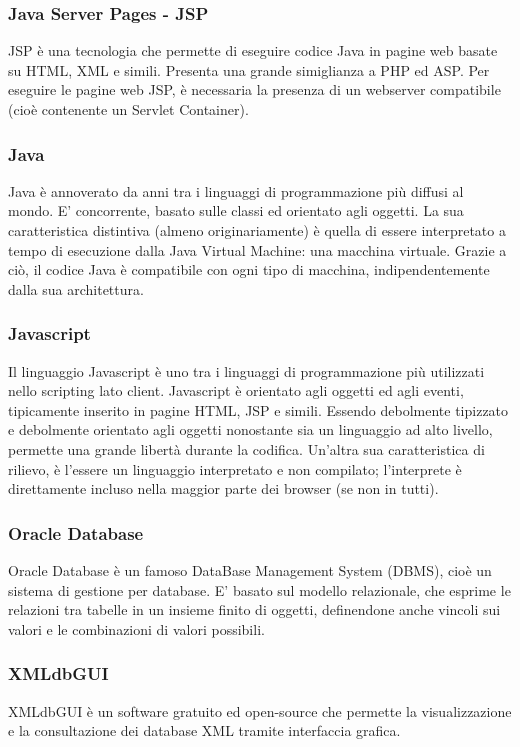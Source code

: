 \documentclass[a4paper]{article}
\begin{document}
\subsubsection{Java Server Pages - JSP}
JSP è una tecnologia che permette di eseguire codice Java in pagine web basate su HTML, XML e simili. Presenta una grande simiglianza a PHP ed ASP. Per eseguire le pagine web JSP, è necessaria la presenza di un webserver compatibile (cioè contenente un Servlet Container).

\subsubsection{Java}
Java è annoverato da anni tra i linguaggi di programmazione più diffusi al mondo. E' concorrente, basato sulle classi ed orientato agli oggetti. La sua caratteristica distintiva (almeno originariamente) è quella di essere interpretato a tempo di esecuzione dalla Java Virtual Machine: una macchina virtuale. Grazie a ciò, il codice Java è compatibile con ogni tipo di macchina, indipendentemente dalla sua architettura.

\subsubsection{Javascript}
Il linguaggio Javascript è uno tra i linguaggi di programmazione più utilizzati nello scripting lato client. Javascript è orientato agli oggetti ed agli eventi, tipicamente inserito in pagine HTML, JSP e simili. Essendo debolmente tipizzato e debolmente orientato agli oggetti nonostante sia un linguaggio ad alto livello, permette una grande libertà durante la codifica. Un'altra sua caratteristica di rilievo, è l'essere un linguaggio interpretato e non compilato; l'interprete è direttamente incluso nella maggior parte dei browser (se non in tutti).

\subsubsection{Oracle Database}
Oracle Database è un famoso DataBase Management System (DBMS), cioè un sistema di gestione per database. E' basato sul modello relazionale, che esprime le relazioni tra tabelle in un insieme finito di oggetti, definendone anche vincoli sui valori e le combinazioni di valori possibili.

\subsubsection{XMLdbGUI}
XMLdbGUI è un software gratuito ed open-source che permette la visualizzazione e la consultazione dei database XML tramite interfaccia grafica.
\end{document}
